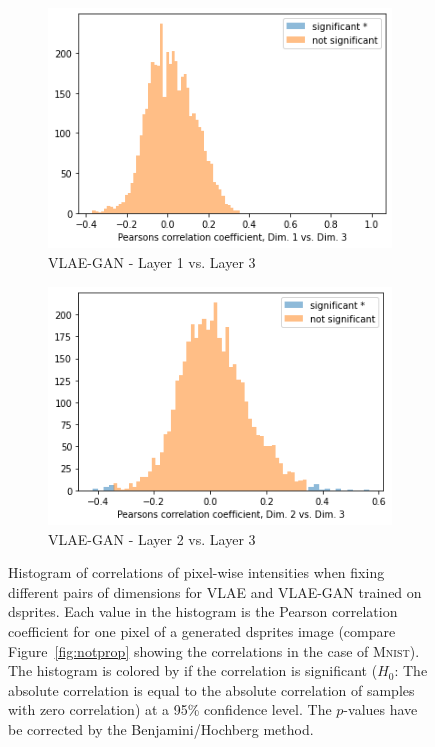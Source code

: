 \begin{figure}
\begin{subfigure}{.3\textwidth}
        \includegraphics[width=\textwidth]{images/notprop/dsprites/vlae_gan/dim_1_3.png}
        \caption{\ac{VLAE}-\ac{GAN} - Layer 1 vs. Layer 3}
    \end{subfigure}
    \hfill
    \begin{subfigure}{.3\textwidth}
        \includegraphics[width=\textwidth]{images/notprop/dsprites/vlae_gan/dim_2_3.png}
        \caption{\ac{VLAE}-\ac{GAN} - Layer 2 vs. Layer 3}
    \end{subfigure}
    \caption[\ac{VLAE} and \ac{VLAE}-\ac{GAN} on dsprites - Pixel intensity correlation]{Histogram of correlations of pixel-wise intensities when fixing different pairs of dimensions for \ac{VLAE} and \ac{VLAE}-\ac{GAN} trained on dsprites.
    Each value in the histogram is the Pearson correlation coefficient for one pixel of a generated dsprites image (compare Figure~\ref{fig:notprop} showing the correlations in the case of \textsc{Mnist}).
    The histogram is colored by if the correlation is significant ($H_0$: The absolute correlation is equal to the absolute correlation of samples with zero correlation) at a 95\% confidence level.
    The $p$-values have be corrected by the Benjamini/Hochberg method.}
    \label{fig:dsprites_vlae_notprop}
\end{figure}

